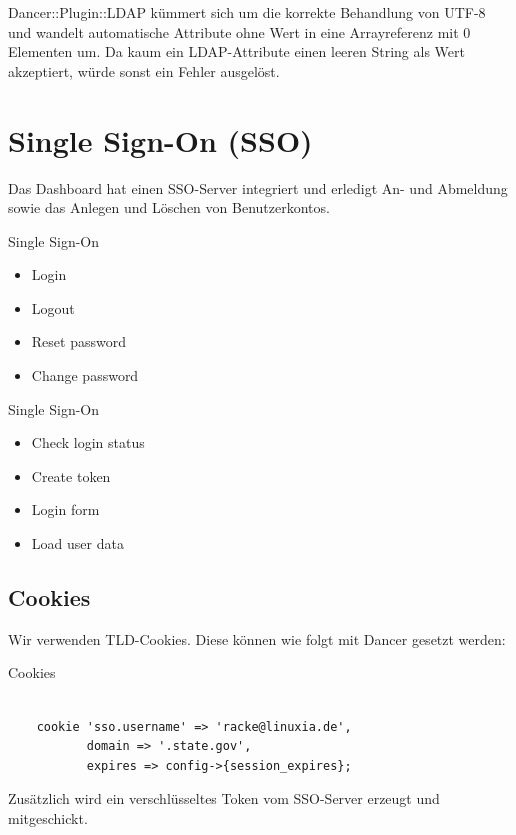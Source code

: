 Dancer::Plugin::LDAP kümmert sich um die korrekte Behandlung
von UTF-8 und wandelt automatische Attribute ohne Wert in eine
Arrayreferenz mit 0 Elementen um. Da kaum ein LDAP-Attribute einen
leeren String als Wert akzeptiert, würde sonst ein Fehler
ausgelöst.

\section{Single Sign-On (SSO)}

Das Dashboard hat einen SSO-Server integriert und erledigt An- und
Abmeldung sowie das Anlegen und Löschen von Benutzerkontos.

\begin{frame}{Single Sign-On}
\begin{itemize}
\item Login
\item Logout
\item Reset password
\item Change password
\end{itemize}
\end{frame}

\begin{frame}{Single Sign-On}
\begin{itemize}
\item Check login status
\item Create token
\item Login form
\item Load user data
\end{itemize}
\end{frame}

\subsection{Cookies}

Wir verwenden TLD-Cookies. Diese können wie folgt mit Dancer
gesetzt werden:

\begin{frame}[fragile]{Cookies}
\begin{lstlisting}

    cookie 'sso.username' => 'racke@linuxia.de',
           domain => '.state.gov',
           expires => config->{session_expires};

\end{lstlisting}
\end{frame}

Zusätzlich wird ein verschlüsseltes Token vom SSO-Server
erzeugt und mitgeschickt.                       
                       
